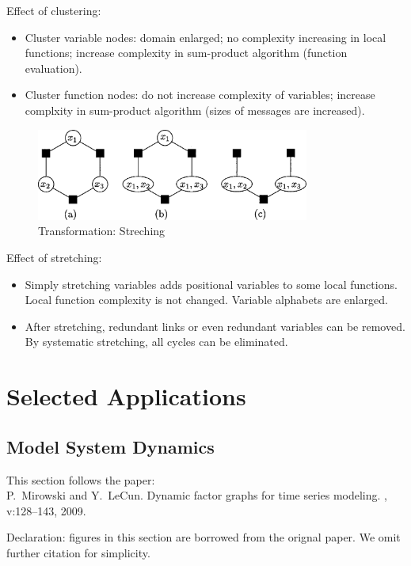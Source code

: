 \documentclass[11pt,a4paper]{article}
\begin{document}
Effect of clustering:
\begin{itemize}
	\item Cluster variable nodes: domain enlarged; no complexity increasing
	in local functions; increase complexity in sum-product algorithm
	(function evaluation). 
	\item Cluster function nodes: do not increase complexity of variables;
	increase complxity in sum-product algorithm
	(sizes of messages are increased). 
\end{itemize}

\begin{figure}[htb]
\centering
	\includegraphics[width=0.8\textwidth]{fig/kschischang2001-streching.png}
	\caption{Transformation: Streching\cite{kschischang2001factor}}
\end{figure}

Effect of stretching:
\begin{itemize}
	\item Simply stretching variables adds positional variables to some local functions.
	Local function complexity is not changed. Variable alphabets are enlarged. 
	\item After stretching, redundant links or even redundant variables can be removed. 
	By systematic stretching, all cycles can be eliminated. 
\end{itemize}



\section{Selected Applications}

\subsection{Model System Dynamics}
This section follows the paper:\\
P.~Mirowski and Y.~LeCun.
\newblock Dynamic factor graphs for time series modeling.
,
  v:128--143, 2009.
  
Declaration: figures in this section are borrowed from the orignal paper\cite{mirowski2009dynamic}. 
We omit further citation for simplicity.
\end{document}
